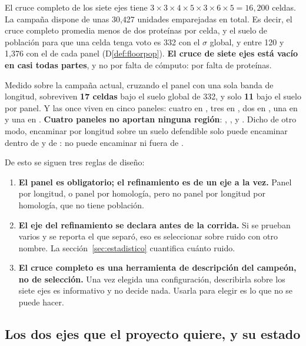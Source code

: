El cruce completo de los siete ejes tiene
$3 \times 3 \times 4 \times 5 \times 3 \times 6 \times 5 = 16{,}200$ celdas. La
campaña dispone de unas 30{,}427 unidades emparejadas en total. Es decir, el cruce
completo promedia menos de dos proteínas por celda, y el suelo de población para
que una celda tenga voto es 332 con el $\sigma$ global, y entre 120 y 1{,}376 con el
de cada panel (D\ref{def:floorpop}). \textbf{El cruce de
siete ejes está vacío en casi todas partes}, y no por falta de cómputo: por falta
de proteínas.

Medido sobre la campaña actual, cruzando el panel con una sola banda de longitud,
sobreviven \textbf{17 celdas} bajo el suelo global de 332, y solo \textbf{11} bajo
el suelo por panel. Y las once viven en cinco paneles: cuatro en ,
tres en , dos en , una en  y una en
. \textbf{Cuatro paneles no aportan ninguna región}: ,
,  y . Dicho de otro modo, encaminar por
longitud sobre un suelo defendible solo puede encaminar dentro de  y de
: no puede encaminar  ni  fuera de .

De esto se siguen tres reglas de diseño:

\begin{enumerate}[leftmargin=1.5em,itemsep=0.35em]
  \item \textbf{El panel es obligatorio; el refinamiento es de un eje a la vez.}
        Panel por longitud, o panel por homología, pero no panel por longitud por
        homología, que no tiene población.
  \item \textbf{El eje del refinamiento se declara antes de la corrida.} Si se
        prueban varios y se reporta el que separó, eso es seleccionar sobre ruido
        con otro nombre. La sección~\ref{sec:estadistico} cuantifica cuánto ruido.
  \item \textbf{El cruce completo es una herramienta de descripción del campeón,
        no de selección.} Una vez elegida una configuración, describirla sobre los
        siete ejes es informativo y no decide nada. Usarla para elegir es lo que no
        se puede hacer.
\end{enumerate}

\subsection{Los dos ejes que el proyecto quiere, y su estado}


